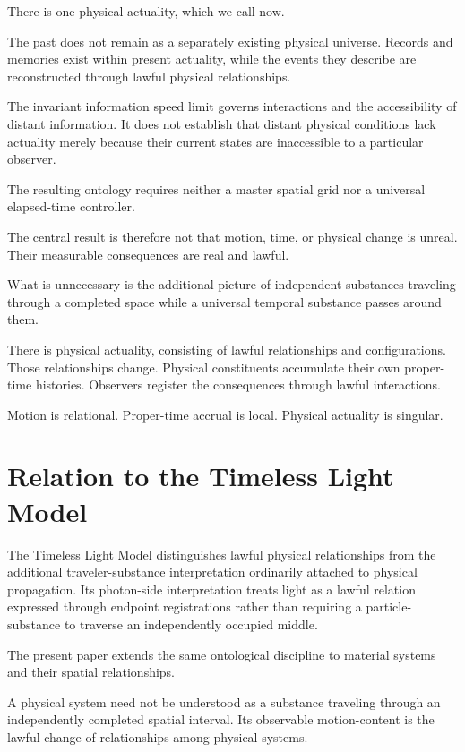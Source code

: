 \documentclass[12pt,onecolumn]{article}
\begin{document}
There is one physical actuality, which we call now.

The past does not remain as a separately existing physical universe. Records and memories exist within present actuality, while the events they describe are reconstructed through lawful physical relationships.

The invariant information speed limit governs interactions and the accessibility of distant information. It does not establish that distant physical conditions lack actuality merely because their current states are inaccessible to a particular observer.

The resulting ontology requires neither a master spatial grid nor a universal elapsed-time controller.

The central result is therefore not that motion, time, or physical change is unreal. Their measurable consequences are real and lawful.

What is unnecessary is the additional picture of independent substances traveling through a completed space while a universal temporal substance passes around them.

There is physical actuality, consisting of lawful relationships and configurations. Those relationships change. Physical constituents accumulate their own proper-time histories. Observers register the consequences through lawful interactions.

Motion is relational. Proper-time accrual is local. Physical actuality is singular.

\section*{Relation to the Timeless Light Model}

The Timeless Light Model distinguishes lawful physical relationships from the additional traveler-substance interpretation ordinarily attached to physical propagation. Its photon-side interpretation treats light as a lawful relation expressed through endpoint registrations rather than requiring a particle-substance to traverse an independently occupied middle.

The present paper extends the same ontological discipline to material systems and their spatial relationships.

A physical system need not be understood as a substance traveling through an independently completed spatial interval. Its observable motion-content is the lawful change of relationships among physical systems.
\end{document}
